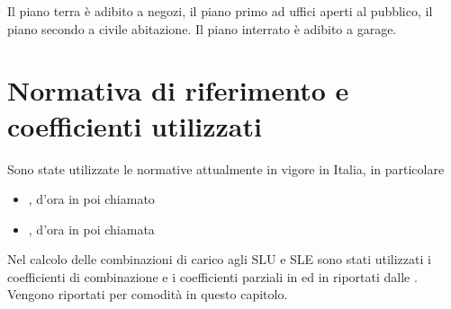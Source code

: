 Il piano terra è adibito a negozi, il piano primo ad uffici aperti al pubblico, il piano secondo a civile abitazione.
Il piano interrato è adibito a garage.

\section{Normativa di riferimento e coefficienti utilizzati}
Sono state utilizzate le normative attualmente in vigore in Italia, in particolare 
\begin{itemize}
\item {}, d'ora in poi chiamato 
\item {}, d'ora in poi chiamata 
\end{itemize}
Nel calcolo delle combinazioni di carico agli SLU e SLE sono stati utilizzati i coefficienti di combinazione e i coefficienti parziali in  ed in  riportati dalle .
Vengono riportati per comodità in questo capitolo.
\clearpage
